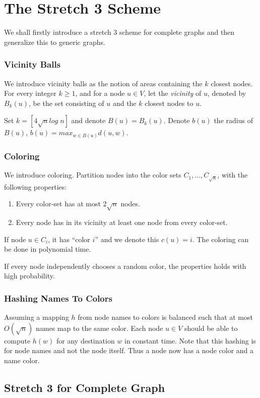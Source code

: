 \chapter{The Stretch 3 Scheme}
We shall firstly introduce a stretch 3 scheme for complete graphs and then generalize this to generic graphs.

\subsection{Vicinity Balls}
We introduce vicinity balls as the notion of areas containing the $k$ closest nodes. For every integer $k \geq 1$, and for a node $u \in V$, let the \textit{vicinity} of $u$, denoted by $B_k(u)$, be the set consisting of $u$ and the $k$ closest nodes to $u$.

Set $k=[4 \sqrt{n}log\; n]$ and denote $B(u) = B_k(u)$. Denote $b(u)$ the radius of $B(u)$, $b(u)=max_{w\in B(u)} d(u,w)$.

\subsection{Coloring}
We introduce coloring.
Partition nodes into the color sets $C_1,\dots,C_{\sqrt{n}}$, with the following properties:
\begin{enumerate}
    \item Every color-set has at most $2 \sqrt{n}$ nodes.
    \item Every node has in its vicinity at least one node from every color-set.
\end{enumerate}

If node $u\in C_i$, it has ``color $i$'' and we denote this $c(u)=i$. The coloring can be done in polynomial time.

If every node independently chooses a random color, the properties holds with high probability.

\subsection{Hashing Names To Colors}
Assuming a mapping $h$ from node names to colors is balanced such that at most $O(\sqrt{n})$ names map to the same color. Each node $u\in V$ should be able to compute $h(w)$ for any destination $w$ in constant time. Note that this hashing is for node names and not the node itself. Thus a node now has a node color and a name color.

\section{Stretch 3 for Complete Graph}
